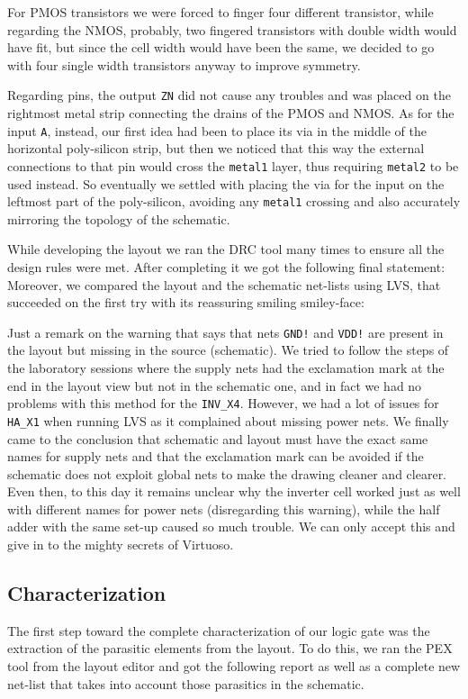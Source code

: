 \documentclass[a4paper]{article}
\newcommand{\inv}{\texttt{INV\_X4}\xspace}
\newcommand{\ha}{\texttt{HA\_X1}\xspace}
\begin{document}
For PMOS transistors we were forced to finger four different transistor, while regarding the NMOS, probably, two fingered transistors with double width would have fit, but since the cell width would have been the same, we decided to go with four single width transistors anyway to improve symmetry.

Regarding pins, the output \texttt{ZN} did not cause any troubles and was placed on the rightmost metal strip connecting the drains of the PMOS and NMOS. As for the input \texttt{A}, instead, our first idea had been to place its via in the middle of the horizontal poly-silicon strip, but then we noticed that this way the external connections to that pin would cross the \texttt{metal1} layer, thus requiring \texttt{metal2} to be used instead. So eventually we settled with placing the via for the input on the leftmost part of the poly-silicon, avoiding any \texttt{metal1} crossing and also accurately mirroring the topology of the schematic.

While developing the layout we ran the DRC tool many times to ensure all the design rules were met. After completing it we got the following final statement:
\newpage
{}
\newpage
Moreover, we compared the layout and the schematic net-lists using LVS, that succeeded on the first try with its reassuring smiling smiley-face:

Just a remark on the warning that says that nets \texttt{GND!} and \texttt{VDD!} are present in the layout but missing in the source (schematic). We tried to follow the steps of the laboratory sessions where the supply nets had the exclamation mark at the end in the layout view but not in the schematic one, and in fact we had no problems with this method for the \inv. However, we had a lot of issues for \ha when running LVS as it complained about missing power nets. We finally came to the conclusion that schematic and layout must have the exact same names for supply nets and that the exclamation mark can be avoided if the schematic does not exploit global nets to make the drawing cleaner and clearer. Even then, to this day it remains unclear why the inverter cell worked just as well with different names for power nets (disregarding this warning), while the half adder with the same set-up caused so much trouble. We can only accept this and give in to the mighty secrets of Virtuoso.


\subsection{Characterization}
\label{sec: inv_char}
The first step toward the complete characterization of our logic gate was the extraction of the parasitic elements from the layout. To do this, we ran the PEX tool from the layout editor and got the following report as well as a complete new net-list that takes into account those parasitics in the schematic.
\end{document}
